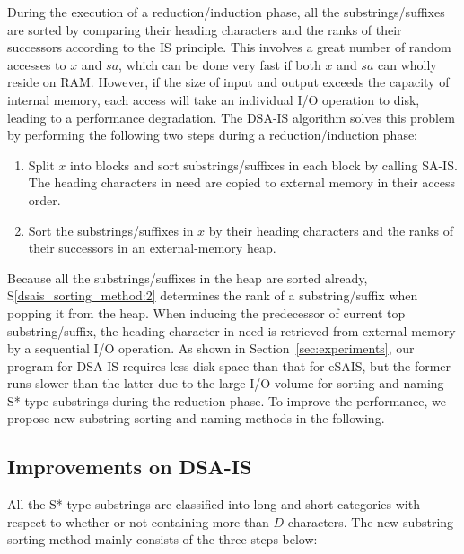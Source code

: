 \documentclass[10pt,journal,compsoc]{IEEEtran}
\begin{document}
During the execution of a reduction/induction phase, all the substrings/suffixes are sorted by comparing their heading characters and the ranks of their successors according to the IS principle. This involves a great number of random accesses to $x$ and $sa$, which can be done very fast if both $x$ and $sa$ can wholly reside on RAM. However, if the size of input and output exceeds the capacity of internal memory, each access will take an individual I/O operation to disk, leading to a performance degradation. The DSA-IS algorithm solves this problem by performing the following two steps during a reduction/induction phase:

\begin{enumerate}[S1]
	
	\item Split $x$ into blocks and sort substrings/suffixes in each block by calling SA-IS. The heading characters in need are copied to external memory in their access order. \label{dsais_sorting_method:1}
	
	\item Sort the substrings/suffixes in $x$ by their heading characters and the ranks of their successors in an external-memory heap. \label{dsais_sorting_method:2}
\end{enumerate}

Because all the substrings/suffixes in the heap are sorted already, S\ref{dsais_sorting_method:2} determines the rank of a substring/suffix when popping it from the heap. When inducing the predecessor of current top substring/suffix, the heading character in need is retrieved from external memory by a sequential I/O operation. As shown in Section~\ref{sec:experiments}, our program for DSA-IS requires less disk space than that for eSAIS, but the former runs slower than the latter due to the large I/O volume for sorting and naming S*-type substrings during the reduction phase. To improve the performance, we propose new substring sorting and naming methods in the following.

\subsection{Improvements on DSA-IS}

All the S*-type substrings are classified into long and short categories with respect to whether or not containing more than $D$ characters. The new substring sorting method mainly consists of the three steps below:
\end{document}
